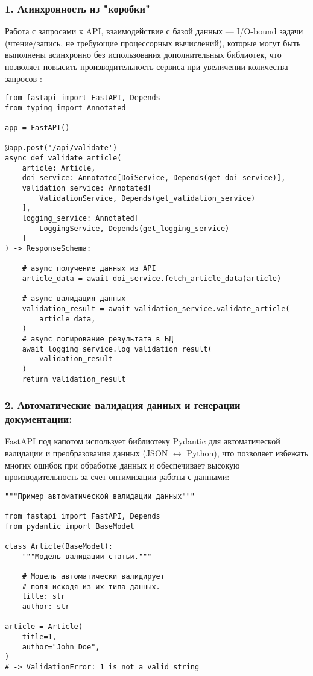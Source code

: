 \subsubsection*{1. Асинхронность из "коробки"}
Работа с запросами к API, взаимодействие с базой данных 
--- I/O-bound задачи (чтение/запись, не требующие процессорных вычислений), которые 
могут быть выполнены асинхронно без использования дополнительных библиотек, что позволяет 
повысить производительность сервиса при увеличении количества запросов \cite{fastapi-bill}:


\begin{verbatim}
from fastapi import FastAPI, Depends
from typing import Annotated

app = FastAPI()

@app.post('/api/validate')
async def validate_article(
    article: Article, 
    doi_service: Annotated[DoiService, Depends(get_doi_service)],
    validation_service: Annotated[
        ValidationService, Depends(get_validation_service)
    ],
    logging_service: Annotated[
        LoggingService, Depends(get_logging_service)
    ]
) -> ResponseSchema:

    # async получение данных из API
    article_data = await doi_service.fetch_article_data(article)

    # async валидация данных
    validation_result = await validation_service.validate_article(
        article_data,
    )
    # async логирование результата в БД
    await logging_service.log_validation_result(
        validation_result
    )
    return validation_result
\end{verbatim}

\subsubsection*{2. Автоматические валидация данных и генерации документации:}
FastAPI под капотом использует библиотеку Pydantic для автоматической валидации 
и преобразования данных (JSON $\leftrightarrow$ Python), что позволяет избежать многих ошибок
при обработке данных и обеспечивает высокую производительность за счет оптимизации 
работы с данными:

\begin{verbatim}
"""Пример автоматической валидации данных"""

from fastapi import FastAPI, Depends
from pydantic import BaseModel

class Article(BaseModel):
    """Модель валидации статьи."""

    # Модель автоматически валидирует
    # поля исходя из их типа данных.
    title: str
    author: str

article = Article(
    title=1,
    author="John Doe",
)
# -> ValidationError: 1 is not a valid string
\end{verbatim}

